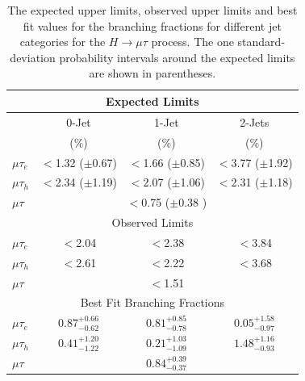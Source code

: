 \documentclass[oneside, letterpaper, oldfontcommands]{memoir}
\begin{document}
{{{\begin{table}[hbtp]
 \centering
  \caption{The expected upper limits, observed upper limits and best fit values for the branching fractions for different
    jet categories for the $H \rightarrow \mu \tau$  process.
    The one standard-deviation probability intervals around the expected limits are shown in parentheses.}
  \label{tab:expected_limits}
   \begin{tabular}{l|c|c|c} \hline
\multicolumn{4}{c}{Expected Limits} \\ \hline
                       &  \multicolumn{1}{c|}{0-Jet}   & \multicolumn{1}{c}{1-Jet}    &  \multicolumn{1}{|c}{2-Jets}                 \\
                       & (\%)                     & (\%)                     & (\%)                    \\ \cline{2-4}
          $\mu\tau_{e}$  &  $<$1.32 ($\pm$0.67)   &  $<$1.66 ($\pm$0.85)   &  $<$3.77 ($\pm$1.92)  \\
      $\mu\tau_{h}$    &  $<$2.34 ($\pm$1.19)   &  $<$2.07 ($\pm$1.06)   &  $<$2.31 ($\pm$1.18)  \\ \hline
            $\mu\tau$  &        \multicolumn{3}{c}{  $<$0.75 ($\pm$0.38 ) }                              \\ \hline
\multicolumn{4}{c}{Observed Limits} \\ \hline
          $\mu\tau_{e}$  &  $<$2.04                &  $<$2.38                &  $<$3.84   \\
      $\mu\tau_{h}$    &  $<$2.61                &  $<$2.22                &  $<$3.68   \\ \hline
            $\mu\tau$  & \multicolumn{3}{c}{  $<$1.51 }   \\ \hline
\multicolumn{4}{c}{Best Fit Branching Fractions} \\ \hline
      \rule[-5pt]{0pt}{17pt}
      $\mu\tau_{e}$  &  $0.87^{+0.66}_{-0.62}$  &  $0.81^{+0.85}_{-0.78}$  &  $0.05^{+1.58}_{-0.97}$  \\
      \rule[-5pt]{0pt}{17pt}
      $\mu\tau_{h}$    &  $0.41^{+1.20}_{-1.22}$  &  $0.21^{+1.03}_{-1.09}$  &  $1.48^{+1.16}_{-0.93}$  \\ \hline
      \rule[-5pt]{0pt}{17pt}
      $\mu\tau$  & \multicolumn{3}{c}{ $0.84^{+0.39}_{-0.37}$ }   \\ \hline
  \end{tabular}
\end{table}
\begin{figure}[hbtp]\centering

\end{figure}}}}
\end{document}
